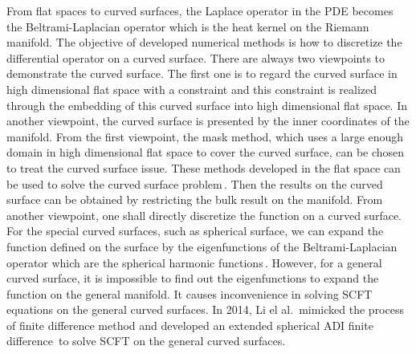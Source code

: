 \documentclass[final,1p,times]{elsarticle}
\begin{document}
From flat spaces to curved surfaces, the Laplace operator in the PDE becomes
the Beltrami-Laplacian operator which is the heat kernel on the Riemann
manifold.  The objective of developed numerical methods is how to discretize
the differential operator on a curved surface.  There are always two viewpoints
to demonstrate the curved surface. The first one is to regard the curved
surface in high dimensional flat space with a constraint and this constraint is
realized through the embedding of this curved surface into high dimensional
flat space. In another viewpoint, the curved surface is presented by the inner
coordinates of the manifold.  From the first viewpoint, the mask method, which
uses a large enough domain in high dimensional flat space to cover the curved
surface, can be chosen to treat the curved surface issue. These methods
developed in the flat space can be used to solve the curved surface
problem\,\cite{li2014mean}. Then the results on the curved surface can be
obtained by restricting the bulk result on the manifold. From another
viewpoint, one shall directly discretize the function on a curved surface. For
the special curved surfaces, such as spherical surface, we can expand the
function defined on the surface by the eigenfunctions of the Beltrami-Laplacian
operator which are the spherical harmonic functions\,\cite{chantawansri2007,
vorselaars2011self}.  However, for a general curved surface, it is impossible
to find out the eigenfunctions to expand the function on the general manifold.
It causes inconvenience in solving SCFT equations on the general curved
surfaces.  In 2014, Li el al.\,\cite{li2014self} mimicked the process of finite
difference method and developed an extended spherical ADI finite
difference\,\cite{li2006self} to solve SCFT on the general curved surfaces. 

\end{document}
